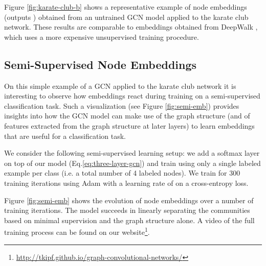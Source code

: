 \documentclass{article} \usepackage{iclr2017_conference,times}
\makeatletter
\newcommand*{\ie}{i.e.\@\xspace}
\newcommand*{\eq}{Eq.\@\xspace}
\makeatother
\begin{document}
Figure \ref{fig:karate-club-b} shows a representative example of node embeddings (outputs ) obtained from an untrained GCN model applied to the karate club network. These results are comparable to embeddings obtained from DeepWalk \citep{perozzi2014deepwalk}, which uses a more expensive unsupervised training procedure.


\subsection{Semi-Supervised Node Embeddings}
On this simple example of a GCN applied to the karate club network it is interesting to observe how embeddings react during training on a semi-supervised classification task. Such a visualization (see Figure \ref{fig:semi-emb}) provides insights into how the GCN model can make use of the graph structure (and of features extracted from the graph structure at later layers) to learn embeddings that are useful for a classification task.

We consider the following semi-supervised learning setup: we add a softmax layer on top of our model (\eq \ref{eq:three-layer-gcn}) and train using only a single labeled example per class (\ie a total number of 4 labeled nodes). We train for 300 training iterations using Adam \citep{kingma2014adam} with a learning rate of  on a cross-entropy loss.

Figure \ref{fig:semi-emb} shows the evolution of node embeddings over a number of training iterations. The model succeeds in linearly separating the communities based on minimal supervision and the graph structure alone. A video of the full training process can be found on our website\footnote{\url{http://tkipf.github.io/graph-convolutional-networks/}}.
\end{document}

